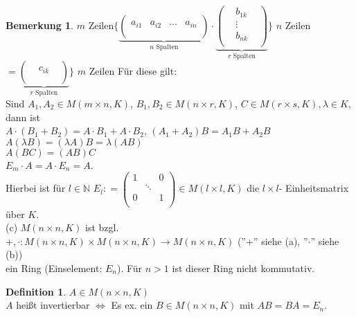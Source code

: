 \documentclass[10pt,a4paper,numbers=endperiod]{scrartcl}
\theoremstyle{definition}
\newtheorem{defi}[satz]{Definition}
\newtheorem{bem}[satz]{Bemerkung}
\begin{document}
\begin{bem}
$m$ Zeilen$\Bigg\{
	\underbrace{\begin{pmatrix}
	\\
	a_{i1} & a_{i2} & \dots & a_{in}\\
	\\
	\end{pmatrix}}_{n \text{ Spalten}} \cdot 
	\underbrace{\begin{pmatrix}
	& b_{1k}&\\
	& \vdots& \\
	& b_{nk}&\\
	\end{pmatrix}}_{r \text{ Spalten}}\Bigg\}$ $n$ Zeilen 
	$= \underbrace{\begin{pmatrix}
		\\
		& c_{ik} &\\
		\\
		\end{pmatrix}}_{r \text{ Spalten}}\Bigg\}$ $m$ Zeilen 
	Für diese gilt:\\
	Sind $A_1,A_2 \in M(m \times n,K)$, $B_1,B_2 \in M(n \times r,K)$, $ C \in M(r \times s,K), \lambda \in K$, dann ist\\ $A\cdot (B_1+B_2) = A \cdot B_1 + A \cdot B_2$, $(A_1+A_2)B = A_1B +A_2B$\\ $A(\lambda B)=(\lambda A)B = \lambda(AB)$\\ $A(BC)=(AB)C$\\ $E_m \cdot A = A \cdot E_n = A$.\\
	Hierbei ist für $l \in \mathbb{N}$ $E_l : = \begin{pmatrix}
	1 && 0\\
	& \ddots&\\
	0&& 1\\
	\end{pmatrix} \in M(l \times l,K)$ die $l \times l$- Einheitsmatrix über $K$.\\
	(c) $M(n \times n,K)$ ist bzgl.\\ 
	$+, \cdot: M(n \times n,K) \times M(n \times n,K) \rightarrow M(n \times n,K)$ (''+'' siehe (a), ''$\cdot$'' siehe (b))\\ 
	ein Ring (Einselement: $E_n$). Für $ n>1$ ist dieser Ring nicht kommutativ. 
\end{bem}

\begin{defi}
	$A \in M(n \times n,K)$\\
	$A$ heißt invertierbar $\Leftrightarrow$ Es ex. ein $B \in M(n \times n,K)$ mit $AB=BA=E_n$.
\end{defi}
\end{document}
